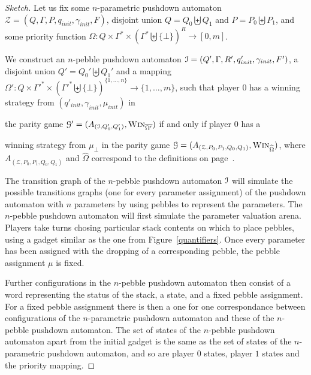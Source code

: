 \documentclass[a4paper,UKenglish,cleveref, autoref, thm-restate]{lipics-v2021}
\newcommand{\win}{\textsc{Win}}
\begin{document}
\begin{proof}[Sketch]


Let us fix some
$n$-parametric pushdown automaton $\mathcal{Z}= (Q, \Gamma, 
P%
, q_{init}, { \gamma_{init}} , F)$,
 disjoint
union $Q = Q_0  \biguplus Q_1$
and $P = P_0 \biguplus P_1$,
and
some priority function 
$\Omega : Q \times \Gamma^* \times ( \Gamma^* \biguplus \{ \bot \})^R \to [0, m ]$.


We construct
  an 
 $n$-pebble pushdown automaton $\mathcal{I} =(Q', \Gamma,  R', q_{init}', {\gamma_{init}} , F')$,
a 
 disjoint
union $Q' = Q_0'  \biguplus Q_1'$
and a mapping $\Omega' : Q \times  \Gamma'^* \times ( \Gamma'^* \biguplus \{ \bot \})^{\{1, \ldots, n\}} \to \{1, \ldots, m \}$,
such that
%
player $0$ has a winning strategy from 
$(q'_{init},\gamma_{init}, \mu_{init})$
in

the parity game
$\mathcal{G'}= (A_{(\ppda, Q'_0, Q'_1)}, \win_{\overline{\Omega'}})$
if and only if
player $0$ has a 

winning strategy from $\mu_\bot$ in 
the parity game
$\mathcal{G} =(A_{(\mathcal{Z}, P_0, P_1, Q_0 , Q_1)}, \win_{\widehat{\Omega}})$,
where		 
$A_{(\mathcal{Z}, P_0, P_1, Q_0 , Q_1)}$
and
$\widehat{\Omega}$
correspond to the definitions on page~\pageref{PPDA reachability game}.

%
%
%
%


The transition graph of the $n$-pebble pushdown automaton $\mathcal{I}$ will simulate the possible transitions graphs 
(one for every 
parameter assignment)
 of the pushdown automaton with $n$ parameters by using pebbles to represent the parameters. 
The $n$-pebble pushdown automaton will first simulate the 
parameter valuation arena.
Players take turns chosing particular stack contents on which to place pebbles,
using a gadget similar as the one from Figure~\ref{quantifiers}. 
Once every parameter has been assigned with the dropping of a corresponding pebble, 
the pebble assignment $\mu$ is fixed.
%
%
%
%
%
%


Further configurations in the $n$-pebble pushdown automaton then consist of a word representing the status of the stack, a state, and a fixed pebble assignment. For a fixed pebble assignment there is then a one for one correspondance between configurations of the $n$-parametric pushdown 
automaton 
and these of the $n$-pebble pushdown automaton. The set of states of the $n$-pebble pushdown automaton apart from the initial gadget is the same as 
the set of states of the $n$-parametric pushdown automaton, and 
so are player $0$ states, player $1$ states and the priority mapping.
\end{proof}
\end{document}
